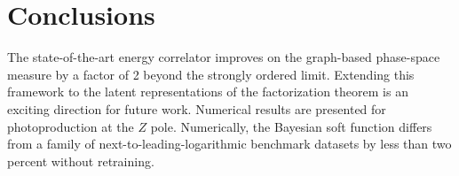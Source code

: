 \section{Conclusions}\label{sec:conclusions}

The state-of-the-art energy correlator improves on the graph-based
phase-space measure by a factor of 2 beyond the strongly ordered limit.
Extending this framework to the latent representations of the
factorization theorem is an exciting direction for future work.
Numerical results are presented for photoproduction at the $Z$ pole.
Numerically, the Bayesian soft function differs from a family of
next-to-leading-logarithmic benchmark datasets by less than two percent
without retraining.

